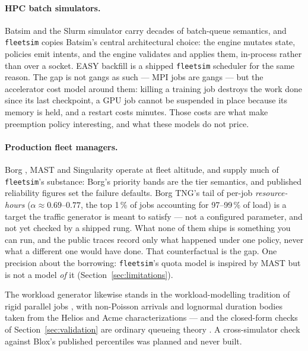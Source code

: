 \paragraph{HPC batch simulators.}
Batsim \cite{batsim2016} and the Slurm simulator carry decades of batch-queue
semantics, and \texttt{fleetsim} copies Batsim's central architectural choice:
the engine mutates state, policies emit intents, and the engine validates and
applies them, in-process rather than over a socket. EASY backfill
\cite{easybackfill1995} is a shipped \texttt{fleetsim} scheduler for the same
reason. The gap is not gangs as such --- MPI jobs are gangs --- but the
accelerator cost model around them: killing a training job destroys the work done
since its last checkpoint, a GPU job cannot be suspended in place because its
memory is held, and a restart costs minutes. Those costs are what make preemption
policy interesting, and what these models do not price.

\paragraph{Production fleet managers.}
Borg \cite{borg2015,borgtng2020}, MAST \cite{mast2024} and Singularity
\cite{singularity2022} operate at fleet altitude, and supply much of
\texttt{fleetsim}'s substance: Borg's priority bands are the tier semantics, and
published reliability figures \cite{metareliability2024,llama3} set the failure
defaults. Borg TNG's tail of per-job \emph{resource-hours} ($\alpha \approx
0.69$--$0.77$, the top 1\,\% of jobs accounting for 97--99\,\% of load) is a
target the traffic generator is meant to satisfy --- not a configured parameter,
and not yet checked by a shipped rung. What
none of them ships is something you can run, and the public traces
\cite{philly2019,helios2021,alibabapai2022,acme2024} record only what happened
under one policy, never what a different one would have done. That counterfactual
is the gap. One precision about the borrowing: \texttt{fleetsim}'s quota model is
inspired by MAST but is not a model \emph{of} it (Section~\ref{sec:limitations}).

The workload generator likewise stands in the workload-modelling tradition of
rigid parallel jobs \cite{feitelson2003}, with non-Poisson arrivals
\cite{paxsonfloyd1995} and lognormal duration bodies taken from the Helios and
Acme characterizations \cite{helios2021,acme2024} --- and the closed-form checks
of
Section~\ref{sec:validation} are ordinary queueing theory \cite{kingman1961}. A
cross-simulator check against Blox's published percentiles was planned and never
built.

